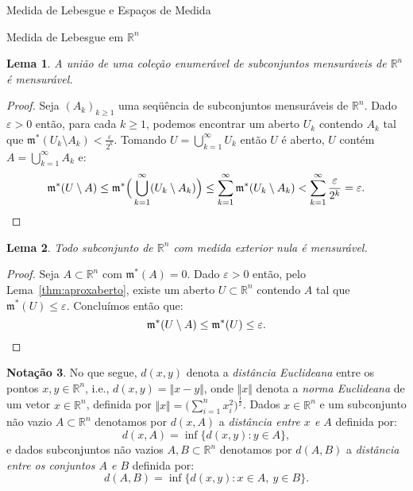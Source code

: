 \documentclass[oneside,final,11pt]{amsbook}
\newcommand{\R}{\mathds R}
\newcommand{\leb}{\mathfrak m}
\theoremstyle{remark}\newtheorem{exercise}{Exercício}[chapter]
\theoremstyle{remark}\newtheorem{*exercise}[exercise]{\hbox to 0pt{\hskip 0pt minus 1fil*}Exercício}
\theoremstyle{definition}\newtheorem{exdefin}{Definição}[chapter]
\theoremstyle{plain}\newtheorem{teo}{Teorema}[section]
\theoremstyle{plain}\newtheorem{lem}[teo]{Lema}
\theoremstyle{plain}\newtheorem{prop}[teo]{Proposição}
\theoremstyle{plain}\newtheorem{cor}[teo]{Corolário}
\theoremstyle{definition}\newtheorem{defin}[teo]{Definição}
\theoremstyle{remark}\newtheorem{rem}[teo]{Observação}
\theoremstyle{definition}\newtheorem{notation}[teo]{Notação}
\theoremstyle{definition}\newtheorem{convention}[teo]{Convenção}
\theoremstyle{definition}\newtheorem{example}[teo]{Exemplo}
\numberwithin{section}{chapter}
\numberwithin{equation}{section}
\begin{document}
\begin{chapter}{Medida de Lebesgue e Espaços de Medida}
\begin{section}[Medida de Lebesgue em $\R^n$]{Medida de Lebesgue em ${\R^n}$}
\begin{lem}\label{thm:uniaoenummens}
A união de uma coleção enumerável de subconjuntos mensuráveis de $\R^n$ é mensurável.
\end{lem}
\begin{proof}
Seja $(A_k)_{k\ge1}$ uma seqüência de subconjuntos mensuráveis de $\R^n$. Dado $\varepsilon>0$ então, para cada
$k\ge1$, podemos encontrar um aberto $U_k$ contendo $A_k$ tal que $\leb^*(U_k\setminus A_k)<\frac\varepsilon{2^k}$.
Tomando $U=\bigcup_{k=1}^\infty U_k$ então $U$ é aberto, $U$ contém $A=\bigcup_{k=1}^\infty A_k$ e:
\[\leb^*(U\setminus A)\le\leb^*\Big(\bigcup_{k=1}^\infty(U_k\setminus A_k)\Big)\le
\sum_{k=1}^\infty\leb^*(U_k\setminus A_k)<\sum_{k=1}^\infty\frac\varepsilon{2^k}=\varepsilon.\qedhere\]
\end{proof}

\begin{lem}\label{thm:nulamens}
Todo subconjunto de $\R^n$ com medida exterior nula é mensurável.
\end{lem}
\begin{proof}
Seja $A\subset\R^n$ com $\leb^*(A)=0$. Dado $\varepsilon>0$ então, pelo Lema~\ref{thm:aproxaberto}, existe
um aberto $U\subset\R^n$ contendo $A$ tal que $\leb^*(U)\le\varepsilon$. Concluímos então que:
\[\leb^*(U\setminus A)\le\leb^*(U)\le\varepsilon.\qedhere\]
\end{proof}

\begin{notation}
No que segue, $d(x,y)$ denota a {\em distância Euclideana\/}
entre os pontos $x,y\in\R^n$, i.e., $d(x,y)=\Vert x-y\Vert$, onde $\Vert x\Vert$ denota a {\em norma Euclideana\/}
de um vetor $x\in\R^n$, definida por $\Vert x\Vert=\big(\sum_{i=1}^nx_i^2\big)^{\frac12}$. Dados
$x\in\R^n$ e um subconjunto não vazio $A\subset\R^n$ denotamos por $d(x,A)$
a {\em distância entre $x$ e $A$\/} definida por:
\[d(x,A)=\inf\big\{d(x,y):y\in A\big\},\]
e dados subconjuntos não vazios $A,B\subset\R^n$ denotamos por $d(A,B)$
a {\em distância entre os conjuntos $A$ e $B$\/}
definida por:
\[d(A,B)=\inf\big\{d(x,y):x\in A,\ y\in B\big\}.\]
\end{notation}


\end{section}
\end{chapter}
\end{document}
